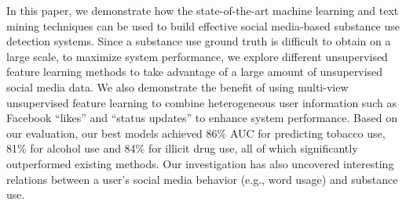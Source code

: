 In this paper, we demonstrate how the state-of-the-art machine learning and text mining techniques can be used to build effective social media-based substance use detection systems.  Since a substance use ground truth is difficult to obtain on a large scale, to maximize system performance, we explore different unsupervised feature learning methods to take advantage of a large amount of unsupervised social media data. We also demonstrate the benefit of using multi-view unsupervised feature learning to combine heterogeneous user information such as Facebook ``likes'' and  ``status updates''  to enhance system performance.  Based on our evaluation, our best models achieved 86\% AUC for predicting tobacco use,  81\% for alcohol use and 84\% for illicit drug use, all of which significantly outperformed existing methods. Our investigation has also uncovered interesting relations between a user's social media behavior (e.g., word usage) and substance use.
